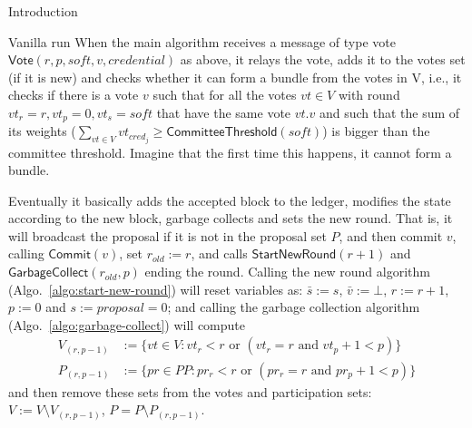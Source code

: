 \documentclass[10pt,a4paper]{article}
\begin{document}
\begin{section}{Introduction}
\begin{subsection}{Vanilla run}
When the main algorithm receives a message of type vote 
$\mathsf{Vote}(r,p,soft,v,credential)$ as above, it relays the vote, adds it to the
votes set (if it is new) and checks whether it can form a bundle from the 
votes in V, i.e., it checks if there is a vote $v$ such that for all the votes 
$vt\in V$ with round $vt_r=r, vt_p=0, vt_s=soft$ that have the same vote $vt.v$ 
and such that the sum of its weights ($\sum_{vt\in V} vt_{cred_j}\ge \mathsf{CommitteeThreshold}(soft)$) 
is bigger than the committee threshold. 
Imagine that the first time this happens, it cannot form a bundle. 

Eventually it basically adds the accepted block to the ledger, modifies the state according
to the new block, garbage collects and sets the new round.
That is, it will broadcast the proposal if it is not in the proposal set $P$,
and then commit $v$, calling $\mathsf{Commit}(v)$, set $r_{old}:=r$,
and calls $\mathsf{StartNewRound}(r+1)$ and $\mathsf{GarbageCollect}(r_{old},p)$
ending the round.
Calling the new round algorithm (Algo.~\ref{algo:start-new-round}) will
reset variables as: $\bar s:=s$, $\bar{v}:=\bot$, $r:=r+1$, $p:=0$ and
$s:=proposal=0$;
and calling the garbage collection algorithm (Algo.~\ref{algo:garbage-collect}) 
will compute 
$$
\begin{array}{rl}
V_{(r,p-1)} & :=\{vt\in V : vt_r < r \text{ or } (vt_r = r \text{ and } vt_p + 1 < p)\}\\
P_{(r,p-1)} & :=\{pr\in PP: pr_r < r \text{ or } (pr_r = r \text{ and } pr_p + 1 < p)\}
\end{array}
$$%
and then remove these sets from the votes and participation sets: $V:=V\setminus V_{(r,p-1)}$,
$P = P\setminus P_{(r,p-1)}$.




\end{subsection}
\end{section}
\end{document}
